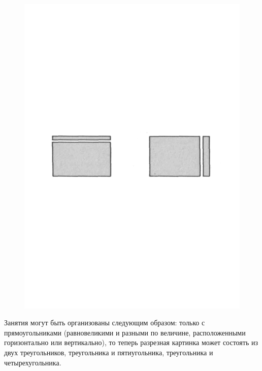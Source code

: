 \documentclass[a5paper]{book}
\begin{document}
\begin{figure}
\includegraphics[width=\linewidth]{media/media/image15.png}
\end{figure}

Занятия могут быть организованы следующим образом: только с
прямоугольниками (равновеликими и разными по величине, расположенными
горизонтально или вертикально), то теперь разрезная картинка может
состоять из двух треугольников, треугольника и пятиугольника,
треугольника и четырехугольника.
\end{document}
